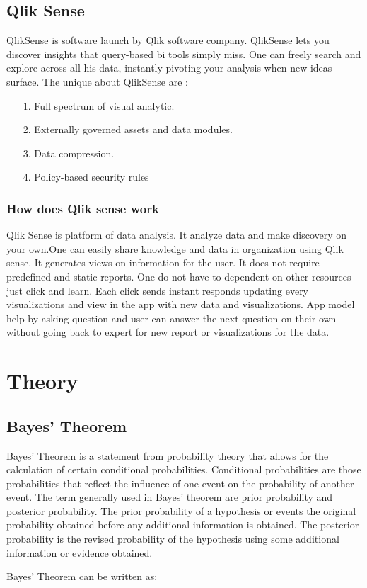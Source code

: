 \section{Qlik Sense}
QlikSense is software launch  by Qlik software company. QlikSense lets you discover insights that query-based \ac{bi} tools simply miss. One can freely search and explore across  all his data, instantly pivoting your analysis when new ideas surface.\cite{troyansky2015qlikview}
\linebreak
The  unique about QlikSense are :

\begin{enumerate}
\item[1.] Full spectrum of visual analytic.
\item[2.] Externally governed assets and data modules.
\item[3.] Data compression.
\item[4.] Policy-based security rules
\end{enumerate}
\par
\subsection{How does Qlik sense work}
Qlik Sense is platform of data analysis. It analyze data and make discovery on your own.One can easily share knowledge and data in organization using Qlik sense. It generates views on information for the user. It does not require predefined and static reports. One do not have to dependent on other resources just click and learn. Each click sends instant responds updating every visualizations and view in the app with new data and visualizations. App model help by asking question and user can answer the next question on their own without going back to expert for new report or visualizations for the data.



\chapter{Theory}
\section{Bayes' Theorem}
\par
Bayes’ Theorem is a statement from probability theory that allows for the calculation of  certain conditional  probabilities. Conditional  probabilities  are  those  probabilities  that reflect  the influence  of  one  event  on  the  probability  of  another  event. The  term  generally used in Bayes’ theorem are prior probability and posterior probability. The prior probability of a hypothesis or events the original probability obtained before any additional information is obtained. The posterior probability is the revised probability of the hypothesis using some additional information or evidence obtained.\cite{garg2013design}
\par Bayes’ Theorem can be written as:

